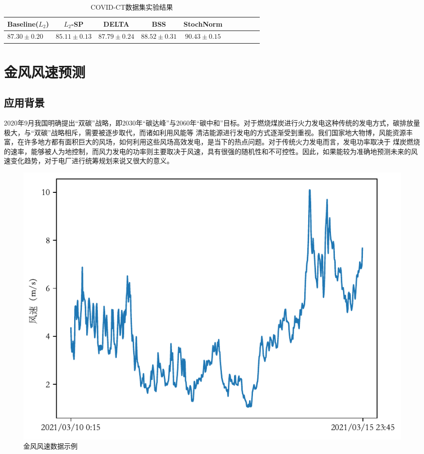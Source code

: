 \begin{table}[h]
	\begin{center}
  \caption{COVID-CT数据集实验结果}
	\label{table:covid-ct}
    \begin{tabular}{lccccccccc}
        \toprule
        Baseline($L_2$) & $L_2$-SP \citep{xuhong2018explicit} & DELTA \citep{li2018delta} & BSS \citep{chen2019catastrophic} &  \textbf{StochNorm}\\
        \midrule
        $87.30\pm0.20$ & $85.11\pm0.13$ & $87.79\pm0.24$ & $88.52\pm0.31$ & $90.43\pm0.15$\\
        \bottomrule
    \end{tabular}
	\end{center}
\end{table}

\section{金风风速预测}

\subsection{应用背景}

2020年9月我国明确提出“双碳”战略，即2030年“碳达峰”与2060年“碳中和”目标。对于燃烧煤炭进行火力发电这种传统的发电方式，碳排放量极大，与“双碳”战略相斥，需要被逐步取代，而诸如利用风能等
清洁能源进行发电的方式逐渐受到重视。我们国家地大物博，风能资源丰富，在许多地方都有面积巨大的风场，如何利用这些风场高效发电，是当下的热点问题。对于传统火力发电而言，发电功率取决于
煤炭燃烧的速率，能够被人为地控制，而风力发电的功率则主要取决于风速，具有很强的随机性和不可控性。因此，如果能较为准确地预测未来的风速变化趋势，对于电厂进行统筹规划来说又很大的意义。

\begin{figure}
  \centering
  \includegraphics[width=0.75\linewidth]{figures/wind.pdf}
  \caption{金风风速数据示例}
  \label{fig:goldwind}
\end{figure}

